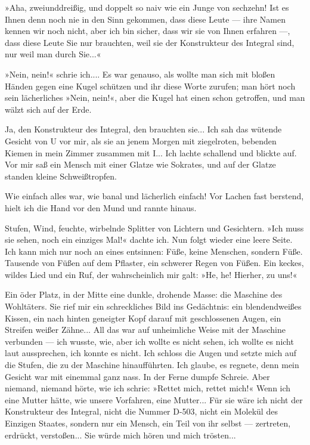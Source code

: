 »Aha, zweiunddreißig, und doppelt so naiv wie ein Junge von
sechzehn! Ist es Ihnen denn noch nie in den Sinn gekommen, dass
diese Leute — ihre Namen kennen wir noch nicht, aber ich bin
sicher, dass wir sie von Ihnen erfahren —, dass diese Leute Sie nur
brauchten, weil sie der Konstrukteur des Integral sind, nur weil
man durch Sie...«

»Nein, nein!« schrie ich.... Es war genauso, als wollte man sich
mit bloßen Händen gegen eine Kugel schützen und ihr diese Worte
zurufen; man hört noch sein lächerliches »Nein, nein!«, aber die
Kugel hat einen schon getroffen, und man wälzt sich auf der Erde.

Ja, den Konstrukteur des Integral, den brauchten sie... Ich sah das
wütende Gesicht von U vor mir, als sie an jenem Morgen mit
ziegelroten, bebenden Kiemen in mein Zimmer zusammen mit I... Ich
lachte schallend und blickte auf. Vor mir saß ein Mensch mit einer
Glatze wie Sokrates, und auf der Glatze standen kleine
Schweißtropfen.

Wie einfach alles war, wie banal und lächerlich einfach! Vor Lachen
fast berstend, hielt ich die Hand vor den Mund und rannte hinaus.

Stufen, Wind, feuchte, wirbelnde Splitter von Lichtern und
Gesichtern. »Ich muss sie sehen, noch ein einziges Mal!« dachte
ich. Nun folgt wieder eine leere Seite. Ich kann mich nur noch an
eines entsinnen: Füße, keine Menschen, sondern Füße. Tausende von
Füßen auf dem Pflaster, ein schwerer Regen von Füßen. Ein keckes,
wildes Lied und ein Ruf, der wahrscheinlich mir galt: »He, he!
Hierher, zu uns!«

Ein öder Platz, in der Mitte eine dunkle, drohende Masse: die
Maschine des Wohltäters. Sie rief mir ein schreckliches Bild ins
Gedächtnis: ein blendendweißes Kissen, ein nach hinten geneigter
Kopf darauf mit geschlossenen Augen, ein Streifen weißer Zähne...
All das war auf unheimliche Weise mit der Maschine verbunden — ich
wusste, wie, aber ich wollte es nicht sehen, ich wollte es nicht
laut aussprechen, ich konnte es nicht. Ich schloss die Augen und
setzte mich auf die Stufen, die zu der Maschine hinaufführten. Ich
glaube, es regnete, denn mein Gesicht war mit einemmal ganz nass.
In der Ferne dumpfe Schreie. Aber niemand, niemand hörte, wie ich
schrie: »Rettet mich, rettet mich!« Wenn ich eine Mutter hätte, wie
unsere Vorfahren, eine Mutter... Für sie wäre ich nicht der
Konstrukteur des Integral, nicht die Nummer D-503, nicht ein
Molekül des Einzigen Staates, sondern nur ein Mensch, ein Teil von
ihr selbst — zertreten, erdrückt, verstoßen... Sie würde mich hören
und mich trösten...

